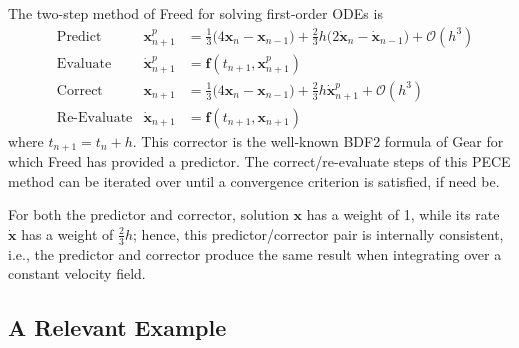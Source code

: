 The two-step method of Freed \cite{Freed17a} for solving first-order ODEs is
\begin{subequations}
    \label{1stOrderODEs}
    \begin{align}
    \mbox{} & \text{Predict} & 
    \mathbf{x}_{n+1}^p & = \tfrac{1}{3} 
    \bigl( 4 \mathbf{x}_n - \mathbf{x}_{n-1} \bigr) + 
    \tfrac{2}{3} h \bigl( 2 \dot{\mathbf{x}}_n - \dot{\mathbf{x}}_{n-1} 
    \bigr) + \mathcal{O} (h^3)
    \label{1stOrderPredictor} \\
    \mbox{} & \text{Evaluate} & 
    \dot{\mathbf{x}}^p_{n+1} & = \mathbf{f} (t_{n+1} , \mathbf{x}_{n+1}^p) 
    \label{1stOrderEvaluate} \\
    \mbox{} & \text{Correct} &
    \mathbf{x}_{n+1} & = \tfrac{1}{3} 
    \bigl( 4 \mathbf{x}_n - \mathbf{x}_{n-1} \bigr) + 
    \tfrac{2}{3} h \dot{\mathbf{x}}^{p}_{n+1} + \mathcal{O} (h^3)
    \label{1stOrderCorrector} \\
    \mbox{} & \text{Re-Evaluate} & 
    \dot{\mathbf{x}}_{n+1} & = \mathbf{f} (t_{n+1} , \mathbf{x}_{n+1}) 
    \label{1stOrderReEvaluate}
    \end{align}
\end{subequations} 
where $t_{n+1} = t_n + h$.  This corrector is the well-known BDF2 formula of Gear for which Freed has provided a predictor.  The correct\slash re-evaluate steps of this PECE method can be iterated over until a convergence criterion is satisfied, if need be. 

For both the predictor and corrector, solution $\mathbf{x}$ has a weight of 1, while its rate $\dot{\mathbf{x}}$ has a weight of $\tfrac{2}{3} h$; hence, this predictor\slash corrector pair is internally consistent, i.e., the predictor and corrector produce the same result when integrating over a constant velocity field.

\newpage
\subsection{A Relevant Example}

